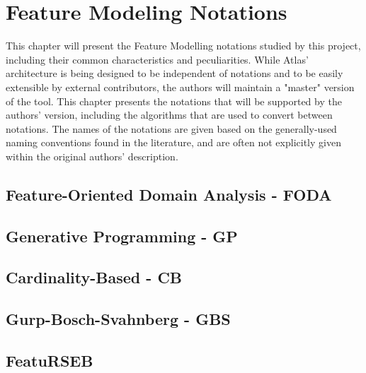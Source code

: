 \chapter{Feature Modeling Notations}
\label{chap:notations}

This chapter will present the Feature Modelling notations studied by this project, including their common characteristics and peculiarities. While Atlas' architecture is being designed to be independent of notations and to be easily extensible by external contributors, the authors will maintain a "master" version of the tool. This chapter presents the notations that will be supported by the authors' version, including the algorithms that are used to convert between notations. The names of the notations are given based on the generally-used naming conventions found in the literature, and are often not explicitly given within the original authors' description.


\section{Feature-Oriented Domain Analysis - FODA}




\section{Generative Programming - GP}




\section{Cardinality-Based - CB}




\section{Gurp-Bosch-Svahnberg - GBS}




\section{FeatuRSEB}

